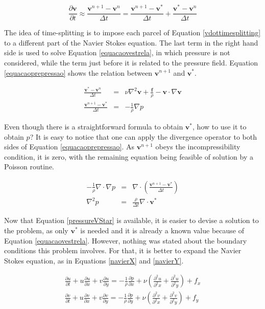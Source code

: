 \documentclass[journal]{IEEEtran}
\begin{document}
\begin{equation}
\frac{\partial \textbf{v}}{\partial t}\approx \frac{\textbf{v}^{n+1}-\textbf{v}^n}{\Delta t}=\frac{\textbf{v}^{n+1}-\textbf{v}^*}{\Delta t}+\frac{\textbf{v}^{*}-\textbf{v}^n}{\Delta t} \label{vdottimesplitting}
\end{equation}

The idea of time-splitting is to impose each parcel of Equation \ref{vdottimesplitting} to a different part of the Navier Stokes equation. The last term in the right hand side is used to solve Equation \ref{equacaovestrela}, in which pressure is not considered, while the term just before it is related to the pressure field. Equation \ref{equacaoprepressao} shows the relation between $\mathbf{v}^{n+1}$ and $\mathbf{v}^{*}$. 

\begin{eqnarray}
\frac{\textbf{v}^{*}-\textbf{v}^n}{\Delta t}&=& \nu\nabla ^2 \textbf{v} + \frac{\textbf{f}}{\rho} - \textbf{v}\cdot \nabla \textbf{v}\label{equacaovestrela}\\
\frac{\textbf{v}^{n+1}-\textbf{v}^*}{\Delta t}&=&-\frac{1}{\rho}\nabla p\label{equacaoprepressao}
\end{eqnarray}

Even though there is a straightforward formula to obtain $\mathbf{v}^{*}$, how to use it to obtain $p$? It is easy to notice that one can apply the divergence operator to both sides of Equation \ref{equacaoprepressao}. As $\mathbf{v}^{n+1}$ obeys the incompressibility condition, it is zero, with the remaining equation being feasible of solution by a Poisson routine.

\begin{eqnarray}
	-\frac{1}{\rho}\nabla\cdot\nabla p\nonumber & = &\nabla\cdot \left(\frac{\textbf{v}^{n+1}-\textbf{v}^*}{\Delta t}\right)\\
	\nabla^2 p\nonumber & = &\frac{\rho}{\Delta t}\nabla\cdot \textbf{v}^*	\label{pressureVStar}
\end{eqnarray}

Now that Equation \ref{pressureVStar} is available, it is easier to devise a solution to the problem, as only $\mathbf{v}^*$ is needed and it is already a known value because of Equation \ref{equacaovestrela}. However, nothing was stated about the boundary conditions this problem involves. For that, it is better to expand the Navier Stokes equation, as in Equations \ref{navierX} and \ref{navierY}.

\begin{eqnarray}
\frac{\partial u}{\partial t}+u\frac{\partial u}{\partial x}+v\frac{\partial
u}{\partial y}=-\frac{1}{\rho}\frac{\partial p}{\partial
x}+\nu\left(\frac{\partial^2 u}{\partial^2 x}+\frac{\partial^2 u}{\partial^2
y}\right)+f_x \label{navierX}\\
\frac{\partial v}{\partial t}+u\frac{\partial v}{\partial x}+v\frac{\partial
v}{\partial y}=-\frac{1}{\rho}\frac{\partial p}{\partial
y}+\nu\left(\frac{\partial^2 v}{\partial^2 x}+\frac{\partial^2 v}{\partial^2
y}\right)+f_y \label{navierY}
\end{eqnarray}
\end{document}

